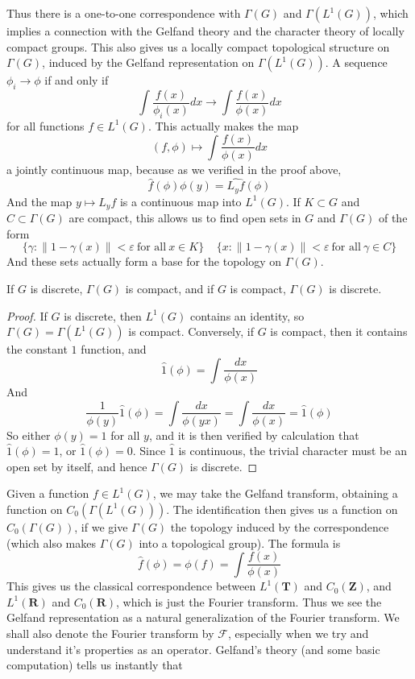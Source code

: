 Thus there is a one-to-one correspondence with $\Gamma(G)$ and $\Gamma(L^1(G))$, which implies a connection with the Gelfand theory and the character theory of locally compact groups. This also gives us a locally compact topological structure on $\Gamma(G)$, induced by the Gelfand representation on $\Gamma(L^1(G))$. A sequence $\phi_i \to \phi$ if and only if
%
\[ \int \frac{f(x)}{\phi_i(x)} dx \to \int \frac{f(x)}{\phi(x)} dx \]
%
for all functions $f \in L^1(G)$. This actually makes the map
%
\[ (f,\phi) \mapsto \int \frac{f(x)}{\phi(x)} dx \]
%
a jointly continuous map, because as we verified in the proof above,
%
\[ \widehat{f}(\phi) \phi(y) = \widehat{L_y f}(\phi) \]
%
And the map $y \mapsto L_y f$ is a continuous map into $L^1(G)$. If $K \subset G$ and $C \subset \Gamma(G)$ are compact, this allows us to find open sets in $G$ and $\Gamma(G)$ of the form
%
\[ \{ \gamma : \| 1 - \gamma(x) \| < \varepsilon\ \text{for all}\ x \in K \}\ \ \ \ \ \{ x : \| 1 - \gamma(x) \| < \varepsilon\ \text{for all}\ \gamma \in C \} \]
%
And these sets actually form a base for the topology on $\Gamma(G)$.

\begin{theorem}
    If $G$ is discrete, $\Gamma(G)$ is compact, and if $G$ is compact, $\Gamma(G)$ is discrete.
\end{theorem}
\begin{proof}
    If $G$ is discrete, then $L^1(G)$ contains an identity, so $\Gamma(G) = \Gamma(L^1(G))$ is compact. Conversely, if $G$ is compact, then it contains the constant $1$ function, and
    \[ \widehat{1}(\phi) = \int \frac{dx}{\phi(x)} \]
    And
    \[ \frac{1}{\phi(y)} \widehat{1}(\phi) = \int \frac{dx}{\phi(yx)} = \int \frac{dx}{\phi(x)} = \hat{1}(\phi) \]
    So either $\phi(y) = 1$ for all $y$, and it is then verified by calculation that $\widehat{1}(\phi) = 1$, or $\widehat{1}(\phi) = 0$. Since $\widehat{1}$ is continuous, the trivial character must be an open set by itself, and hence $\Gamma(G)$ is discrete.
\end{proof}

Given a function $f \in L^1(G)$, we may take the Gelfand transform, obtaining a function on $C_0(\Gamma(L^1(G)))$. The identification then gives us a function on $C_0(\Gamma(G))$, if we give $\Gamma(G)$ the topology induced by the correspondence (which also makes $\Gamma(G)$ into a topological group). The formula is
%
\[ \widehat{f}(\phi) = \phi(f) = \int \frac{f(x)}{\phi(x)} \]
%
This gives us the classical correspondence between $L^1(\mathbf{T})$ and $C_0(\mathbf{Z})$, and $L^1(\mathbf{R})$ and $C_0(\mathbf{R})$, which is just the Fourier transform. Thus we see the Gelfand representation as a natural generalization of the Fourier transform. We shall also denote the Fourier transform by $\mathcal{F}$, especially when we try and understand it's properties as an operator. Gelfand's theory (and some basic computation) tells us instantly that

